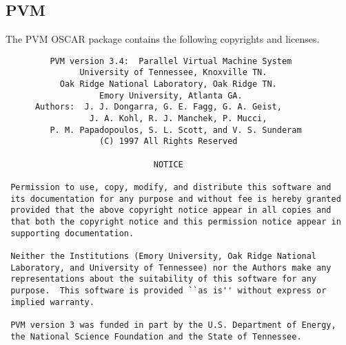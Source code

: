 %
%
%

\subsection{PVM}
The PVM OSCAR package contains the following copyrights and licenses.

\begin{verbatim}
         PVM version 3.4:  Parallel Virtual Machine System
               University of Tennessee, Knoxville TN.
           Oak Ridge National Laboratory, Oak Ridge TN.
                   Emory University, Atlanta GA.
      Authors:  J. J. Dongarra, G. E. Fagg, G. A. Geist,
                 J. A. Kohl, R. J. Manchek, P. Mucci,
         P. M. Papadopoulos, S. L. Scott, and V. S. Sunderam
                   (C) 1997 All Rights Reserved

                              NOTICE

 Permission to use, copy, modify, and distribute this software and
 its documentation for any purpose and without fee is hereby granted
 provided that the above copyright notice appear in all copies and
 that both the copyright notice and this permission notice appear in
 supporting documentation.

 Neither the Institutions (Emory University, Oak Ridge National
 Laboratory, and University of Tennessee) nor the Authors make any
 representations about the suitability of this software for any
 purpose.  This software is provided ``as is'' without express or
 implied warranty.

 PVM version 3 was funded in part by the U.S. Department of Energy,
 the National Science Foundation and the State of Tennessee.
\end{verbatim}

